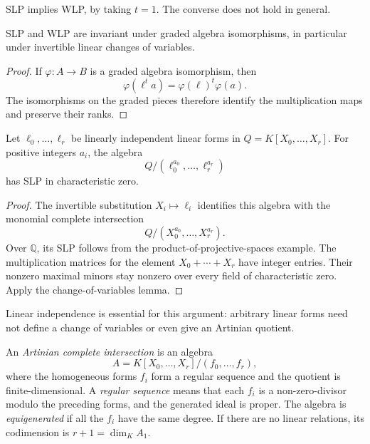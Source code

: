 SLP implies WLP, by taking $t=1$.
The converse does not hold in general.

\begin{lemma}
\label{lemma-change-of-variables}
SLP and WLP are invariant under graded
algebra isomorphisms, in particular under
invertible linear changes of variables.
\end{lemma}

\begin{proof}
If $\varphi:A\longrightarrow B$ is a
graded algebra isomorphism, then
$$
\varphi(\ell^t a)=\varphi(\ell)^t\varphi(a).
$$
The isomorphisms on the graded pieces
therefore identify the multiplication maps
and preserve their ranks.
\end{proof}

\begin{lemma}
\label{lemma-powers-of-forms}
Let $\ell_0,\ldots,\ell_r$ be linearly
independent linear forms in
$Q=K[X_0,\ldots,X_r]$.
For positive integers $a_i$, the algebra
$$
Q/(\ell_0^{a_0},\ldots,\ell_r^{a_r})
$$
has SLP in characteristic zero.
\end{lemma}

\begin{proof}
The invertible substitution
$X_i\longmapsto\ell_i$ identifies this
algebra with the monomial complete
intersection
$$
Q/(X_0^{a_0},\ldots,X_r^{a_r}).
$$
Over $\mathbb{Q}$, its SLP follows from the
product-of-projective-spaces example.
The multiplication matrices for the element
$X_0+\cdots+X_r$ have integer entries.
Their nonzero maximal minors stay nonzero
over every field of characteristic zero.
Apply the change-of-variables lemma.
\end{proof}

Linear independence is essential for this
argument: arbitrary linear forms need not
define a change of variables or even give
an Artinian quotient.

\begin{definition}
\label{definition-complete-intersection}
An \emph{Artinian complete intersection}
is an algebra
$$
A=K[X_0,\ldots,X_r]/(f_0,\ldots,f_r),
$$
where the homogeneous forms $f_i$ form a
regular sequence and the quotient is
finite-dimensional.
A \emph{regular sequence} means that each
$f_i$ is a non-zero-divisor modulo the
preceding forms, and the generated ideal
is proper.
The algebra is \emph{equigenerated} if all
the $f_i$ have the same degree.
If there are no linear relations, its
codimension is $r+1=\dim_K A_1$.
\end{definition}

